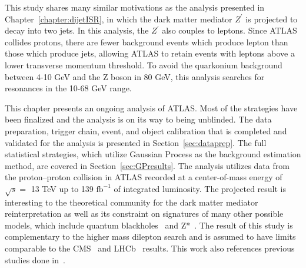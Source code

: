 This study shares many similar motivations as the analysis presented in Chapter~\ref{chapter:dijetISR}, in which the dark matter mediator $Z^\prime$ is projected to decay into two jets. In this analysis, the $Z^\prime$ also couples to leptons. Since ATLAS collides protons, there are fewer background events which produce lepton than those which produce jets, allowing ATLAS to retain events with leptons above a lower transverse momentum threshold. To avoid the quarkonium background between 4-10 GeV and the Z boson in 80 GeV, this analysis searches for resonances in the 10-68 GeV range.

This chapter presents an ongoing analysis of ATLAS. Most of the strategies have been finalized and the analysis is on its way to being unblinded. The data preparation, trigger chain, event, and object calibration that is completed and validated for the analysis is presented in Section~\ref{sec:dataprep}. The full statistical strategies, which utilize Gaussian Process as the background estimation method, are covered in Section~\ref{sec:GPresults}. The analysis utilizes data from the proton--proton collision in ATLAS
recorded at a center-of-mass energy of $\sqrt{s}=$ 13 TeV up to 139 $\textrm{fb}^{-1}$ of integrated luminosity. The projected result is interesting to the theoretical community for the dark matter mediator reinterpretation as well as its constraint on signatures of many other possible models, which include quantum blackholes~\cite{QBH2008} and Z*~\cite{ZStar2008}. The result of this study is complementary to the higher mass dilepton search and is assumed to have limits comparable to the CMS~\cite{CMS-PAS-EXO-19-018} and LHCb~\cite{Aaij:2722971} results. This work also references previous studies done in~\cite{2014}.

